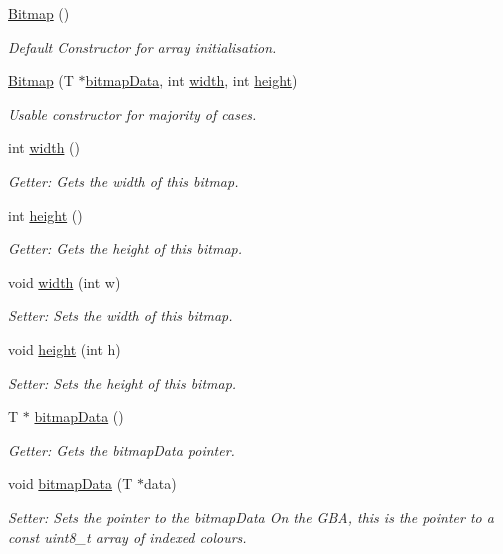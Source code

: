 \begin{DoxyCompactItemize}
\item 
\hyperlink{class_bitmap_a639b3eb5055babcb2a24c1fc84539cb4}{Bitmap} ()
\begin{DoxyCompactList}\small\item\em Default Constructor for array initialisation. \end{DoxyCompactList}\item 
\hyperlink{class_bitmap_a87c905c83a3d6241363d10f32c97b5ac}{Bitmap} (T $\ast$\hyperlink{class_bitmap_afe7336697101154d5e19cc1953760f5d}{bitmap\-Data}, int \hyperlink{class_bitmap_aa9d9619b37ce2339ee1db4c4a3068fcb}{width}, int \hyperlink{class_bitmap_a08ed36c28aedf05e2cb37cc73fe77022}{height})
\begin{DoxyCompactList}\small\item\em Usable constructor for majority of cases. \end{DoxyCompactList}\item 
int \hyperlink{class_bitmap_aa9d9619b37ce2339ee1db4c4a3068fcb}{width} ()
\begin{DoxyCompactList}\small\item\em Getter\-: Gets the width of this bitmap. \end{DoxyCompactList}\item 
int \hyperlink{class_bitmap_a08ed36c28aedf05e2cb37cc73fe77022}{height} ()
\begin{DoxyCompactList}\small\item\em Getter\-: Gets the height of this bitmap. \end{DoxyCompactList}\item 
void \hyperlink{class_bitmap_a1b469bd5c8f4ecc1ada64e67a4892ed1}{width} (int w)
\begin{DoxyCompactList}\small\item\em Setter\-: Sets the width of this bitmap. \end{DoxyCompactList}\item 
void \hyperlink{class_bitmap_ad848451ebb0a8ed1386012e98b6b5374}{height} (int h)
\begin{DoxyCompactList}\small\item\em Setter\-: Sets the height of this bitmap. \end{DoxyCompactList}\item 
T $\ast$ \hyperlink{class_bitmap_afe7336697101154d5e19cc1953760f5d}{bitmap\-Data} ()
\begin{DoxyCompactList}\small\item\em Getter\-: Gets the bitmap\-Data pointer. \end{DoxyCompactList}\item 
void \hyperlink{class_bitmap_a0b930d95addaa750b52efb8cc308de81}{bitmap\-Data} (T $\ast$data)
\begin{DoxyCompactList}\small\item\em Setter\-: Sets the pointer to the bitmap\-Data On the G\-B\-A, this is the pointer to a const uint8\-\_\-t array of indexed colours. \end{DoxyCompactList}\end{DoxyCompactItemize}
